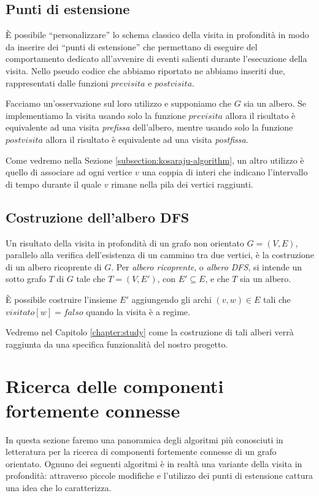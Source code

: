 \subsection{Punti di estensione}
\label{subsection:dfs-extension-point}
\`E possibile ``personalizzare'' lo schema classico della visita in
profondit\`a in modo da inserire dei ``punti di estensione'' che
permettano di eseguire del comportamento dedicato all'avvenire di
eventi salienti durante l'esecuzione della visita. Nello pseudo codice
che abbiamo riportato ne abbiamo inseriti due, rappresentati dalle
funzioni $previsita$ e $postvisita$.

Facciamo un'osservazione sul loro utilizzo e supponiamo che $G$ sia un
albero. Se implementiamo la visita usando solo la funzione $previsita$
allora il risultato \`e equivalente ad una visita \emph{prefissa}
dell'albero, mentre usando solo la funzione $postvisita$ allora
il risultato \`e equivalente ad una visita \emph{postfissa}.

Come vedremo nella Sezione \ref{subsection:kosaraju-algorithm}, un
altro utilizzo \`e quello di associare ad ogni vertice $v$ una coppia
di interi che indicano l'intervallo di tempo durante il quale $v$
rimane nella pila dei vertici raggiunti.

\subsection{Costruzione dell'albero DFS}
Un risultato della visita in profondit\`a di un grafo non orientato $G
= (V, E)$, parallelo alla verifica dell'esistenza di un cammino tra
due vertici, \`e la costruzione di un albero ricoprente di $G$. Per
\emph{albero ricoprente}, o \emph{albero DFS}, si intende un
sotto grafo $T$ di $G$ tale che $T = (V, E')$, con $E' \subseteq E$, e
che $T$ sia un albero.

\`E possibile costruire l'insieme $E'$ aggiungendo gli archi $(v, w)
\in E$ tali che $visitato[w] = falso$ quando la visita \`e a regime.

Vedremo nel Capitolo \ref{chapter:study} come la costruzione di tali
alberi verr\`a raggiunta da una specifica funzionalit\`a del nostro
progetto.

\section{Ricerca delle componenti fortemente connesse}

In questa sezione faremo una panoramica degli algoritmi pi\`u
conosciuti in letteratura per la ricerca di componenti fortemente
connesse di un grafo orientato. Ognuno dei seguenti algoritmi \`e in
realt\`a una variante della visita in profondit\`a: attraverso piccole
modifiche e l'utilizzo dei punti di estensione cattura una idea che lo
caratterizza.

